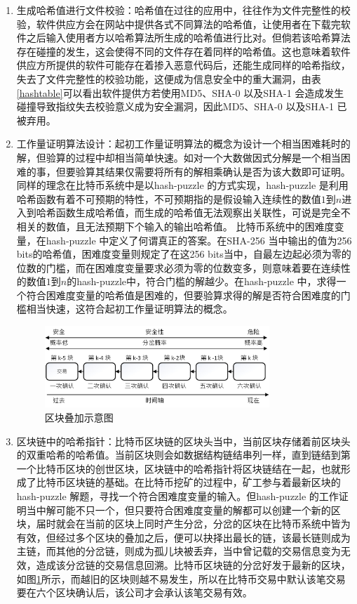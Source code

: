 				\begin{enumerate}
				\item 生成哈希值进行文件校验：哈希值在过往的应用中，往往作为文件完整性的校验，软件供应方会在网站中提供各式不同算法的哈希值，让使⽤者在下载完软件之后输⼊使⽤者方以哈希算法所⽣成的哈希值进⾏⽐对。但倘若该哈希算法存在碰撞的发生，这会使得不同的文件存在着同样的哈希值。这也意味着软件供应方所提供的软件可能存在着掺入恶意代码后，还能生成同样的哈希指纹，失去了文件完整性的校验功能，这便成为信息安全中的重大漏洞，由表\ref{hashtable}可以看出软件提供方若使用MD5、SHA-0 以及SHA-1 会造成发生碰撞导致指纹失去校验意义成为安全漏洞，因此MD5、SHA-0 以及SHA-1 已被弃用。

				\item 工作量证明算法设计：起初工作量证明算法的概念为设计一个相当困难耗时的解，但验算的过程中却相当简单快速。如对一个大数做因式分解是一个相当困难的事，但要验算其结果仅需要将所有的解相乘确认是否为该大数即可证明。同样的理念在比特币系统中是以hash-puzzle 的方式实现，hash-puzzle 是利用哈希函数有着不可预期的特性，不可预期指的是假设输入连续性的数值$1$到$n$进入到哈希函数生成哈希值，而生成的哈希值无法观察出关联性，可说是完全不相关的数值，且无法预期下个输入的输出哈希值。
				比特币系统中的困难度变量，在hash-puzzle 中定义了何谓真正的答案。在SHA-256 当中输出的值为256 bits的哈希值，困难度变量则规定了在这256 bits当中，自最左边起必须为零的位数的门槛，而在困难度变量要求必须为零的位数变多，则意味着要在连续性的数值$1$到$n$的hash-puzzle中，符合门槛的解越少。在hash-puzzle 中，求得一个符合困难度变量的哈希值是困难的，但要验算求得的解是否符合困难度的门槛相当快速，这符合起初工作量证明算法的概念。

				\begin{figure}[!htbp]
					\centering
					\includegraphics[width = 0.8\textwidth]{6confirm.jpg}
					\caption{区块叠加示意图}\label{6confirm}
				\end{figure}

				\item 区块链中的哈希指针：比特币区块链的区块头当中，当前区块存储着前区块头的双重哈希的哈希值。当前区块则会如数据结构链结串列一样，直到链结到第一个比特币区块的创世区块，区块链中的哈希指针将区块链结在一起，也就形成了比特币区块链的基础。在比特币挖矿的过程中，矿工参与着最新区块的hash-puzzle 解题，寻找一个符合困难度变量的输入。但hash-puzzle  的工作证明当中解可能不只一个，但只要符合困难度变量的解都可以创建一个新的区块，届时就会在当前的区块上同时产生分岔，分岔的区块在比特币系统中皆为有效，但经过多个区块的叠加之后，便可以抉择出最长的链，该最长链则成为主链，而其他的分岔链，则成为孤儿块被丢弃，当中曾记载的交易信息变为无效，造成该分岔链的交易信息回溯。比特币区块链的分岔好发于最新的区块，如图\ref{6confirm}所示，而越旧的区块则越不易发生，所以在比特币交易中默认该笔交易要在六个区块确认后，该公司才会承认该笔交易有效。

				\end{enumerate}

